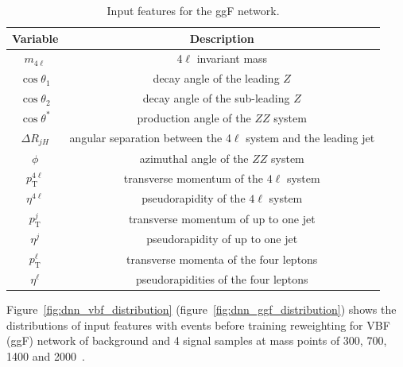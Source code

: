 \begin{table}[htbp]
        \centering
        \caption{Input features for the ggF network.}
        \label{tab:dnn_features_ggf}
        \begin{tabular}{c | c}
                \toprule
                Variable & Description \\
                \midrule
                $m_{4\ell}$ & 4$\ell$ invariant mass \\
                $\cos\theta_1$ & decay angle of the leading $Z$ \\
                $\cos\theta_2$ & decay angle of the sub-leading $Z$ \\
                $\cos\theta^*$ & production angle of the $ZZ$ system \\
                $\Delta R _{jH}$ & angular separation between the 4$\ell$ system and the leading jet\\
                $\phi$ & azimuthal angle of the $ZZ$ system \\
                $p_\mathrm{T}^{4\ell}$ & transverse momentum of the $4\ell$ system \\
                $\eta^{4\ell}$ & pseudorapidity of the $4\ell$ system \\
                $p_\mathrm{T}^j$ & transverse momentum of up to one jet \\
                $\eta^j$ & pseudorapidity of up to one jet \\
                $p_\mathrm{T}^\ell$ & transverse momenta of the four leptons \\
                $\eta^\ell$ & pseudorapidities of the four leptons  \\
                \bottomrule
        \end{tabular}
\end{table}

Figure~\ref{fig:dnn_vbf_distribution} (figure~\ref{fig:dnn_ggf_distribution}) shows the distributions of input features with events before training reweighting for VBF (ggF) network of background and 4 signal samples at mass points of 300, 700, 1400 and 2000~\gev.

